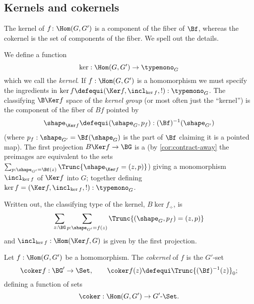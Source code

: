 \subsection{Kernels and cokernels}
The kernel of $f\colon\Hom(G,G')$ is a component of the fiber of $\Bf$, whereas the cokernel is the set of components of the fiber.  We spell out the details.
\label{sec:kerandcoker}
\begin{definition}
  \label{def:kernel}
 We define a function
  $$\ker:\Hom(G,G')\to\typemono_G$$
  which we call the \emph{kernel}.
  If $f:\Hom(G,G')$  is a homomorphism we must specify the ingredients in  $\ker f\defequi(\Ker f,\incl_{\ker f},!):\typemono_G$.
  The classifying $\B\Ker f$ space of the \emph{kernel group}
 (or most often just the ``kernel'') is the component of the fiber of $Bf$ pointed by
 $$\shape_{\Ker f}\defequi(\shape_G,p_f):(\Bf)^{-1}(\shape_{G'})$$
  (where $p_f:\shape_{G'}=\Bf(\shape_G)$ is the part of $\Bf$ claiming it is a pointed map).
The first projection $B\Ker f\to \BG$ is a \covering (by \cref{cor:contract-away} the preimages are equivalent to the sets $\sum_{p:\shape_{G'}=\Bf(z)}\Trunc{\shape_{\Ker f}=(z,p)}$) giving a monomorphism
$\incl_{\ker f}$ of $\Ker f$ into $G$; together defining $\ker f=(\Ker f,\incl_{\ker f},!):\typemono_G$.
\end{definition}

Written out, the classifying type of the kernel,
$B\ker f_\div$, is $$\sum_{z:\BG}\sum_{p:\shape_{G'}=f(z)}\Trunc{(\shape_G,p_f)=(z,p)}$$
and $\incl_{\ker f}:\Hom(\Ker f, G)$ is given by the first projection.

\begin{definition}
  \label{def:cokernel}
  Let $f:\Hom(G,G')$  be a homomorphism.
The \emph{cokernel} of $f$ is the $G'$-set
\[
  \coker f:\BG'\to\Set,\qquad \coker f(z)\defequi  \Trunc{(\Bf)^{-1}(z)}_0;
\]
defining a function of sets
$$\coker:\Hom(G,G')\to G'\text{-}\Set.$$
\end{definition}

